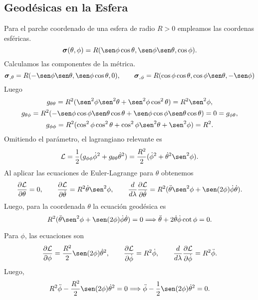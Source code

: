 \subsection{Geodésicas en la Esfera}
Para el parche coordenado de una esfera de radio $R > 0$ empleamos las coordenas esféricas.
\begin{equation}
	\patch(\theta, \phi) = R(\sen \phi \cos \theta, \sen \phi \sen \theta, \cos \phi).
\end{equation}
Calculamos las componentes de la métrica.
\begin{equation}
	\patch_{,\theta} = R(-\sen \phi \sen \theta, \sen \phi \cos \theta,0), \qquad
	\patch_{,\phi} = R(\cos \phi \cos \theta, \cos \phi \sen \theta, -\sen\phi)
\end{equation}
Luego
\begin{gather}
	g_{\theta\theta} = R^2(\sen^2\phi \sen^2\theta + \sen^2\phi \cos^2 \theta)
	= R^2\sen^2\phi, \\
		g_{\theta\phi} = R^2(-\sen\phi \cos \phi \sen \theta \cos \theta + \sen\phi \cos \phi \sen \theta \cos \theta) = 0 = g_{\phi\theta},\\
	g_{\phi\phi} = R^2(\cos^2\phi \cos^2\theta + \cos^2\phi \sen^2 \theta + \sen^2\phi) = R^2.
\end{gather}
Omitiendo el parámetro, el lagrangiano relevante es
\begin{equation}
	\mathcal L = \frac12 (g_{\phi\phi}\dot \phi^2 + g_{\theta\theta} \dot\theta^2)
	= \frac{R^2}{2}(\dot \phi^2 +  \dot \theta^2\sen^2\phi).
\end{equation}
Al aplicar las ecuaciones de Euler-Lagrange para $\theta$ obtenemos
\begin{equation}
	\partialD{\mathcal L}{\theta} = 0, \qquad
	 \partialD{\mathcal L}{\dot \theta} = R^2 \dot \theta \sen^2\phi, \qquad
	 \frac{d}{d\lambda}\partialD{\mathcal L}{\dot \theta}  = R^2 (\ddot \theta\sen^2\phi  + \sen(2\phi)\dot \phi \dot \theta).
\end{equation}
Luego, para la coordenada $\theta$ la ecuación geodésica es
\begin{equation}
	R^2 ( \ddot \theta\sen^2\phi  + \sen(2\phi)\dot \phi \dot \theta)  = 0 \Longrightarrow \ddot \theta + 2 \dot \theta \dot \phi \cot \phi= 0.
\end{equation}

Para $\phi$, las ecuaciones son
\begin{equation}
	\partialD{\mathcal L}{\phi} = \frac{R^2}{2}\sen(2\phi)\dot \theta^2, \qquad
	 \partialD{\mathcal L}{\dot \phi} = R^2 \dot \phi, \qquad
	 \frac{d}{d\lambda}\partialD{\mathcal L}{\dot \phi}  = R^2 \ddot \phi.
\end{equation}
Luego,
\begin{equation}
	R^2 \ddot \phi - \frac{R^2}{2}\sen(2\phi)\dot \theta^2 = 0 \Longrightarrow \ddot \phi - \frac{1}{2}\sen(2\phi)\dot \theta^2 = 0.
\end{equation}

